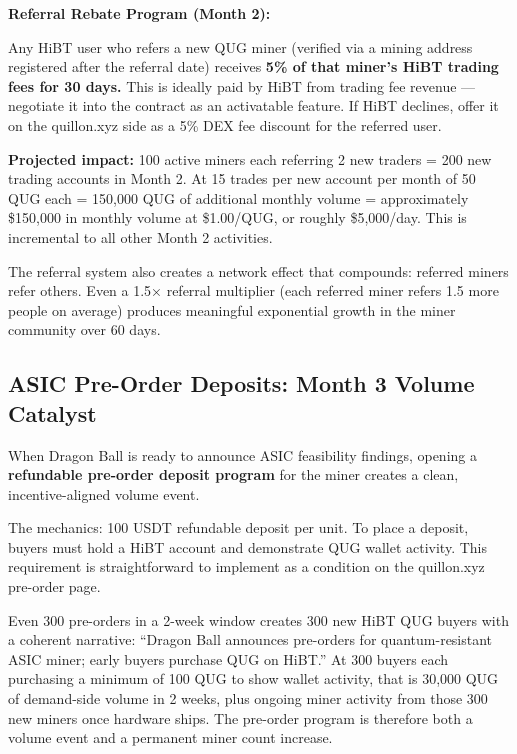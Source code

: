 \documentclass[11pt,a4paper]{article}
\begin{document}
\begin{tcolorbox}[bluebox]
\textbf{Referral Rebate Program (Month 2):}

\medskip
Any HiBT user who refers a new QUG miner (verified via a mining address registered after the referral date) receives \textbf{5\% of that miner's HiBT trading fees for 30 days.} This is ideally paid by HiBT from trading fee revenue — negotiate it into the contract as an activatable feature. If HiBT declines, offer it on the quillon.xyz side as a 5\% DEX fee discount for the referred user.

\medskip
\textbf{Projected impact:} 100 active miners each referring 2 new traders = 200 new trading accounts in Month 2. At 15 trades per new account per month of 50 QUG each = 150,000 QUG of additional monthly volume = approximately \$150,000 in monthly volume at \$1.00/QUG, or roughly \$5,000/day. This is incremental to all other Month 2 activities.

\medskip
The referral system also creates a network effect that compounds: referred miners refer others. Even a 1.5× referral multiplier (each referred miner refers 1.5 more people on average) produces meaningful exponential growth in the miner community over 60 days.
\end{tcolorbox}

\subsection{ASIC Pre-Order Deposits: Month 3 Volume Catalyst}

When Dragon Ball is ready to announce ASIC feasibility findings, opening a \textbf{refundable pre-order deposit program} for the miner creates a clean, incentive-aligned volume event.

The mechanics: 100 USDT refundable deposit per unit. To place a deposit, buyers must hold a HiBT account and demonstrate QUG wallet activity. This requirement is straightforward to implement as a condition on the quillon.xyz pre-order page.

Even 300 pre-orders in a 2-week window creates 300 new HiBT QUG buyers with a coherent narrative: ``Dragon Ball announces pre-orders for quantum-resistant ASIC miner; early buyers purchase QUG on HiBT.'' At 300 buyers each purchasing a minimum of 100 QUG to show wallet activity, that is 30,000 QUG of demand-side volume in 2 weeks, plus ongoing miner activity from those 300 new miners once hardware ships. The pre-order program is therefore both a volume event and a permanent miner count increase.
\end{document}
